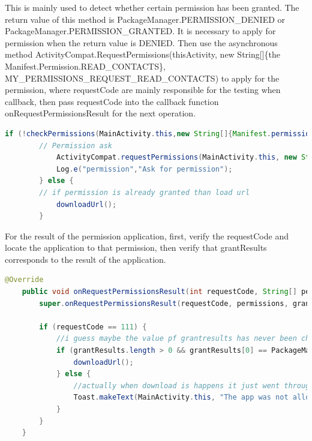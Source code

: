 \documentclass[a4paper,11pt]{article}
\begin{document}
\begin{itemize}
    \par This is mainly used to detect whether certain permission has been granted. The return value of this method is PackageManager.PERMISSION\_DENIED or PackageManager.PERMISSION\_GRANTED. It is necessary to apply for permission when the return value is DENIED. Then use the asynchronous method ActivityCompat.RequestPermissio\-ns(thisActivity, new String[]\{the Manifest.Permission.READ\_CONTACTS\}, MY\_PERM\-ISSIONS\_REQUEST\_READ\_CONTACTS) to apply for the permission, where requestCode are mainly responsible for the testing when callback, then pass requestCode into the callback function onRequestPermissionsResult for the next operation.
    
    \begin{lstlisting}[language=Java]
    if (!checkPermissions(MainActivity.this,new String[]{Manifest.permission.WRITE_EXTERNAL_STORAGE})){
        // Permission ask
            ActivityCompat.requestPermissions(MainActivity.this, new String[]{Manifest.permission.WRITE_EXTERNAL_STORAGE}, 111);
            Log.e("permission","Ask for permission");
        } else {
        // if permission is already granted than load url
            downloadUrl();
        }
    \end{lstlisting}
    
    \par For the result of the permission application, first, verify the requestCode and locate the application to that permission, then verify that grantResults corresponds to the result of the application. 
    
    \begin{lstlisting}[language=Java]
    @Override
    public void onRequestPermissionsResult(int requestCode, String[] permissions, int[] grantResults) {
        super.onRequestPermissionsResult(requestCode, permissions, grantResults);

        if (requestCode == 111) {
            //i guess maybe the value pf grantresults has never been changed
            if (grantResults.length > 0 && grantResults[0] == PackageManager.PERMISSION_GRANTED) {
                downloadUrl();
            } else {
                //actually when download is happens it just went through all the permissioncheck flow to this toast ,i just don't know why
                Toast.makeText(MainActivity.this, "The app was not allowed to read your storage.", Toast.LENGTH_LONG).show();
            }
        }
    }
    \end{lstlisting}
    

\end{itemize}
\end{document}

